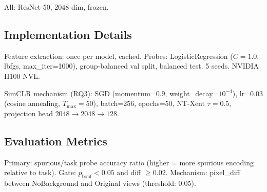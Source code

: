 All: ResNet-50, 2048-dim, frozen.

\subsection{Implementation Details}

Feature extraction: once per model, cached. Probes: LogisticRegression ($C=1.0$, lbfgs, max\_iter=1000), group-balanced val split, balanced test. 5 seeds. NVIDIA H100 NVL.

SimCLR mechanism (RQ3): SGD (momentum=0.9, weight\_decay=$10^{-4}$), lr=0.03 (cosine annealing, $T_\text{max}=50$), batch=256, epochs=50, NT-Xent $\tau=0.5$, projection head $2048 \to 2048 \to 128$.

\subsection{Evaluation Metrics}

Primary: spurious/task probe accuracy ratio (higher = more spurious encoding relative to task). Gate: $p_\text{bonf} < 0.05$ and diff $\geq 0.02$. Mechanism: pixel\_diff between NoBackground and Original views (threshold: 0.05).
